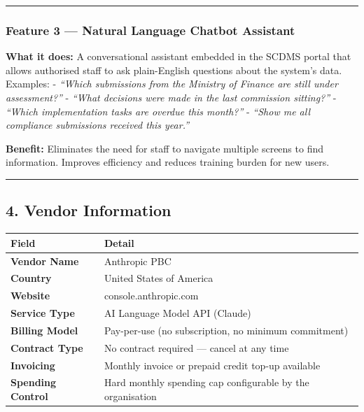 \documentclass[
]{article}
\newcounter{none} %
\begin{document}
\begin{center}\rule{0.5\linewidth}{0.5pt}\end{center}

\subsubsection{Feature 3 --- Natural Language Chatbot
Assistant}\label{feature-3-natural-language-chatbot-assistant}

\textbf{What it does:} A conversational assistant embedded in the SCDMS
portal that allows authorised staff to ask plain-English questions about
the system's data. Examples: - \emph{``Which submissions from the
Ministry of Finance are still under assessment?''} - \emph{``What
decisions were made in the last commission sitting?''} - \emph{``Which
implementation tasks are overdue this month?''} - \emph{``Show me all
compliance submissions received this year.''}

\textbf{Benefit:} Eliminates the need for staff to navigate multiple
screens to find information. Improves efficiency and reduces training
burden for new users.

\begin{center}\rule{0.5\linewidth}{0.5pt}\end{center}

\subsection{4. Vendor Information}\label{vendor-information}

{\def\LTcaptype{none} %
\begin{longtable}[]{@{}
  >{\raggedright\arraybackslash}p{}
  >{\raggedright\arraybackslash}p{}@{}}
\toprule\noalign{}
\begin{minipage}[b]{\linewidth}\raggedright
Field
\end{minipage} & \begin{minipage}[b]{\linewidth}\raggedright
Detail
\end{minipage} \\
\midrule\noalign{}
\endhead
\bottomrule\noalign{}
\endlastfoot
\textbf{Vendor Name} & Anthropic PBC \\
\textbf{Country} & United States of America \\
\textbf{Website} & console.anthropic.com \\
\textbf{Service Type} & AI Language Model API (Claude) \\
\textbf{Billing Model} & Pay-per-use (no subscription, no minimum
commitment) \\
\textbf{Contract Type} & No contract required --- cancel at any time \\
\textbf{Invoicing} & Monthly invoice or prepaid credit top-up
available \\
\textbf{Spending Control} & Hard monthly spending cap configurable by
the organisation \\
\end{longtable}
}
\end{document}
